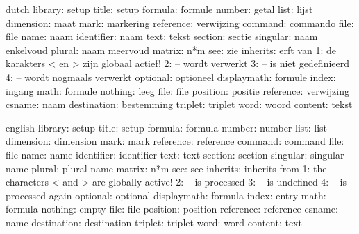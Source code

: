 
%
%


\usemodule[set-02]

\unprotect


\def\setupnumfont  {}
\def\setuptxtfont  {}
\def\setupintfont#1{\uppercase{#1}}
\def\setupvarfont  {\sl}
\def\setupoptfont  {\sl}
\def\setupalwcolor {}
\def\setupoptcolor {darkgray}

  {\ignorespaces}

\startmessages  dutch  library: setup
        title:  setup
      formula:  formule
       number:  getal
         list:  lijst
    dimension:  maat
         mark:  markering
    reference:  verwijzing
      command:  commando
         file:  file
         name:  naam
   identifier:  naam
         text:  tekst
      section:  sectie
     singular:  naam enkelvoud
       plural:  naam meervoud
       matrix:  n*m
          see:  zie
     inherits:  erft van
            1:  de karakters < en > zijn globaal actief!
            2:  -- wordt verwerkt
            3:  -- is niet gedefinieerd
            4:  -- wordt nogmaals verwerkt
     optional:  optioneel
  displaymath:  formule
        index:  ingang
         math:  formule
      nothing:  leeg
         file:  file
     position:  positie
    reference:  verwijzing
       csname:  naam
  destination:  bestemming
      triplet:  triplet
         word:  woord
      content:  tekst
\stopmessages

\startmessages  english  library: setup
        title:  setup
      formula:  formula
       number:  number
         list:  list
    dimension:  dimension
         mark:  mark
    reference:  reference
      command:  command
         file:  file
         name:  name
   identifier:  identifier
         text:  text
      section:  section
     singular:  singular name
       plural:  plural name
       matrix:  n*m
          see:  see
     inherits:  inherits from
            1:  the characters < and > are globally active!
            2:  -- is processed
            3:  -- is undefined
            4:  -- is processed again
     optional:  optional
  displaymath:  formula
        index:  entry
         math:  formula
      nothing:  empty
         file:  file
     position:  position
    reference:  reference
       csname:  name
  destination:  destination
      triplet:  triplet
         word:  word
      content:  text
\stopmessages

